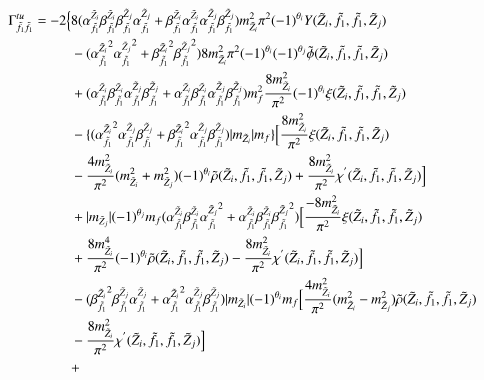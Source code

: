 \documentclass[final,3p,times]{elsarticle}
\begin{document}
\begin{equation}
\begin{aligned}
\Gamma_{\tilde{f}_1 \tilde{f}_1}^{tu} =  -2\Big\{&8({\alpha_{\tilde{f}_1}^{\tilde{Z}_i}}{\beta_{\tilde{f}_1}^{\tilde{Z}_i}}{\beta_{\tilde{f}_1}^{\tilde{Z}_j}}{\alpha_{\tilde{f}_1}^{\tilde{Z}_j}} + {\beta_{\tilde{f}_1}^{\tilde{Z}_i}}{\alpha_{\tilde{f}_1}^{\tilde{Z}_i}}{\alpha_{\tilde{f}_1}^{\tilde{Z}_j}} {\beta_{\tilde{f}_1}^{\tilde{Z}_j}}){m_{\tilde{Z}_i}^2 \pi^2}(-1)^{\theta_i}Y(\tilde{Z}_i,\tilde{f}_1, \tilde{f}_1, \tilde{Z}_j) \\ & -({\alpha_{\tilde{f}_1}^{\tilde{Z}_i}}^2 {\alpha_{\tilde{f}_1}^{\tilde{Z}_j}}^2 + {\beta_{\tilde{f}_1}^{\tilde{Z}_i}}^2 {\beta_{\tilde{f}_1}^{\tilde{Z}_j}}^2){8 m_{\tilde{Z}_i}^2 \pi^2} (-1)^{\theta_i}(-1)^{\theta_j} \tilde{\phi}(\tilde{Z}_i, \tilde{f}_1, \tilde{f}_1, \tilde{Z}_j) \\ & + ( {\alpha_{\tilde{f}_1}^{\tilde{Z}_i}}{\beta_{\tilde{f}_1}^{\tilde{Z}_i}}{\alpha_{\tilde{f}_1}^{\tilde{Z}_j}}{\beta_{\tilde{f}_1}^{\tilde{Z}_j}}+ {\alpha_{\tilde{f}_1}^{\tilde{Z}_i}}{\beta_{\tilde{f}_1}^{\tilde{Z}_i}} {\alpha_{\tilde{f}_1}^{\tilde{Z}_j}}{\beta_{\tilde{f}_1}^{\tilde{Z}_j}})m_{f}^2 {8 m_{\tilde{Z}_i}^2 \over \pi^2} (-1)^{\theta_i} \xi (\tilde{Z}_i,\tilde{f}_1, \tilde{f}_1, \tilde{Z}_j) \\ & -\{({\alpha_{\tilde{f}_1}^{\tilde{Z}_i}}^2 {\alpha_{\tilde{f}_1}^{\tilde{Z}_j}} {\beta_{\tilde{f}_1}^{\tilde{Z}_j}} + {\beta_{\tilde{f}_1}^{\tilde{Z}_i}}^2 {\alpha_{\tilde{f}_1}^{\tilde{Z}_j}} {\beta_{\tilde{f}_1}^{\tilde{Z}_j}})|m_{\tilde{Z}_i}|m_{f}\}\Big[{8 m_{\tilde{Z}_i}^2 \over \pi^2}\xi(\tilde{Z}_i, \tilde{f}_1, \tilde{f}_1, \tilde{Z}_j) \\ & - {4m_{\tilde{Z}_i}^2 \over \pi^2}(m_{\tilde{Z}_i}^2 + m_{\tilde{Z}_j}^2)(-1)^{\theta_i}\tilde{\rho}(\tilde{Z}_i,\tilde{f}_1,\tilde{f}_1,\tilde{Z}_j) + {8m_{\tilde{Z}_i}^2 \over \pi^2} \chi^{'} (\tilde{Z}_i,\tilde{f}_1,\tilde{f}_1,\tilde{Z}_j)\Big] \\ & + |m_{\tilde{Z}_j}|(-1)^{\theta_j}m_{f}({\alpha_{\tilde{f}_1}^{\tilde{Z}_i}}{\beta_{\tilde{f}_1}^{\tilde{Z}_i}}{\alpha_{\tilde{f}_1}^{\tilde{Z}_j}}^2 + {\alpha_{\tilde{f}_1}^{\tilde{Z}_i}} {\beta_{\tilde{f}_1}^{\tilde{Z}_i}}{\beta_{\tilde{f}_1}^{\tilde{Z}_j}}^2)\Big[{-8m_{\tilde{Z}_i}^2 \over \pi^2}\xi(\tilde{Z}_i,\tilde{f}_1,\tilde{f}_1,\tilde{Z}_j) \\ & + {8 m_{\tilde{Z}_i}^4 \over \pi^2}(-1)^{\theta_i}\tilde{\rho}(\tilde{Z}_i,\tilde{f}_1,\tilde{f}_1,\tilde{Z}_j) - {8 m_{\tilde{Z}_i}^2 \over \pi^2}\chi^{'}(\tilde{Z}_i,\tilde{f}_1,\tilde{f}_1,\tilde{Z}_j)\Big] \\ & - ({\beta_{\tilde{f}_1}^{\tilde{Z}_i}}^2{\beta_{\tilde{f}_1}^{\tilde{Z}_j}}{\alpha_{\tilde{f}_1}^{\tilde{Z}_j}} + {\alpha_{\tilde{f}_1}^{\tilde{Z}_i}}^2{\alpha_{\tilde{f}_1}^{\tilde{Z}_j}} {\beta_{\tilde{f}_1}^{\tilde{Z}_j}})|m_{\tilde{Z}_i}|(-1)^{\theta_i}m_{f}\Big[{4m_{\tilde{Z}_i}^2 \over \pi^2}(m_{\tilde{Z}_i}^2 - m_{\tilde{Z}_j}^2)\tilde{\rho}(\tilde{Z}_i,\tilde{f}_1,\tilde{f}_1,\tilde{Z}_j) \\ & - {8m_{\tilde{Z}_i}^2 \over \pi^2} \chi^{'}(\tilde{Z}_i,\tilde{f}_1,\tilde{f}_1,\tilde{Z}_j)\Big] \\ & + 
\end{aligned}
\end{equation}
\end{document}
